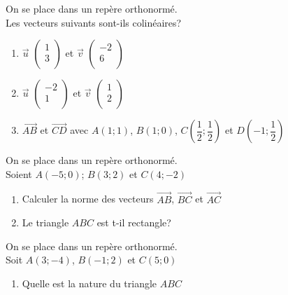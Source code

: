 \begin{exercice}
On se place dans un repère orthonormé.\\
Les vecteurs suivants sont-ils colinéaires? 
\begin{enumerate}
\item $\overrightarrow{u}$ 
$\begin{pmatrix}
1\\ 3\\
\end{pmatrix}$ et $\overrightarrow{v}$ 
$\begin{pmatrix}
-2\\ 6\\
\end{pmatrix}$
\item $\overrightarrow{u}$ 
$\begin{pmatrix}
-2\\ 1\\
\end{pmatrix}$ et $\overrightarrow{v}$ 
$\begin{pmatrix}
1\\ 2\\
\end{pmatrix}$
\item $\overrightarrow{AB}$ et $\overrightarrow{CD}$ avec $A(1;1)$, $B(1;0)$, $C\left( \dfrac{1}{2};\dfrac{1}{2}\right) $ et $D\left( -1;\dfrac{1}{2}\right) $
\end{enumerate}
\end{exercice}

\begin{exercice}
On se place dans un repère orthonormé.\\
Soient $A(-5;0)$; $B(3;2)$ et $C(4;-2)$
\begin{enumerate}
\item Calculer la norme des vecteurs $\overrightarrow{AB}$, $\overrightarrow{BC}$ et $\overrightarrow{AC}$
\item Le triangle $ABC$ est t-il rectangle?
\end{enumerate}
\end{exercice}

\begin{exercice}
On se place dans un repère orthonormé.\\
Soit $A(3;-4)$, $B(-1;2)$ et $C(5;0)$
\begin{enumerate}
\item Quelle est la nature du triangle $ABC$
\end{enumerate} 
\end{exercice}

